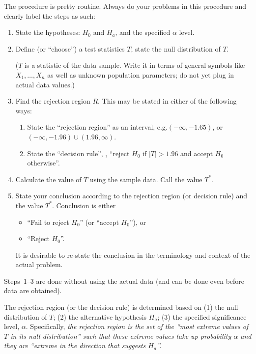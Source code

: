 \documentclass[12pt]{article}
\begin{document}
The procedure is pretty routine.
Always do your problems in this procedure and clearly
label the steps as such:
\begin{enumerate}
\item State the hypotheses: $H_0$ and $H_a$, and the specified $\alpha$ level.
\item Define (or ``choose'') a test statistics $T$;
    state the null distribution of $T$.

    ($T$ is a statistic of the data sample.
    Write it in terms of general symbols like $X_1,\dotsc,X_n$
    as well as unknown population parameters;
    do not yet plug in actual data values.)
\item Find the rejection region $R$. This may be stated in either of the
    following ways:
    \begin{enumerate}
    \item
    State the ``rejection region'' as an interval, e.g.\@ $(-\infty,
    -1.65)$, or $(-\infty, -1.96) \cup (1.96, \infty)$.
    \item
    State the ``decision rule'', \eg,
    ``reject $H_0$ if $|T| > 1.96$ and accept $H_0$ otherwise''.
    \end{enumerate}
\item Calculate the value of $T$ using the sample data. Call the value
    $T^*$.
\item State your conclusion according to the rejection region
    (or decision rule) and the value $T^*$.
    Conclusion is either
    \begin{itemize}
    \item
    ``Fail to reject $H_0$'' (or ``accept $H_0$''),
    or
    \item
    ``Reject $H_0$''.
    \end{itemize}

    It is desirable to re-state the conclusion in the terminology and
    context of the actual problem.
\end{enumerate}

Steps~1--3 are done without using the actual data (and can be done even
before data are obtained).


\alert
The rejection region (or the decision rule) is determined based on
(1) the null distribution of $T$;
(2) the alternative hypothesis $H_a$;
(3) the specified significance level, $\alpha$.
Specifically,
\emph{the rejection region is the set of the
``most extreme values of $T$ in its null distribution''
such that
these extreme values take up probability $\alpha$ and they are
``extreme in the direction that suggests $H_a$''.}
\end{document}
